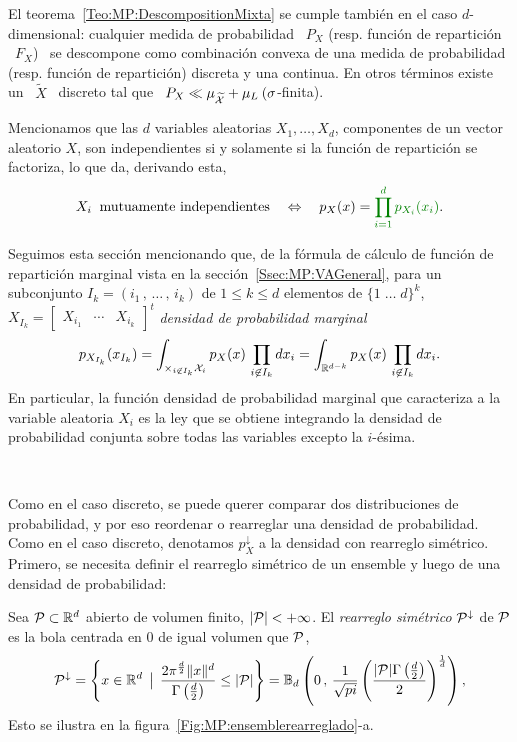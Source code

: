 El                                      teorema~\ref{Teo:MP:DescompositionMixta}
se cumple tambi\'en en el caso $d$-dimensional: cualquier medida de probabilidad
\  $P_X$  (resp.  funci\'on  de  repartici\'on \  $F_X$)  \  se descompone  como
combinaci\'on  convexa  de  una  medida  de probabilidad  (resp.   funci\'on  de
repartici\'on)  discreta  y una  continua.   En  otros  t\'erminos existe  un  \
$\widetilde{X}$ \  discreto tal que \  $P_X \ll \mu_{\widetilde{\X}}  + \mu_L \:
(\sigma$-finita).

Mencionamos que las $d$ variables  aleatorias $X_1, \ldots, X_d$, componentes de
un vector  aleatorio $X$, son independientes  si y solamente si  la funci\'on de
repartici\'on se factoriza, lo que da, derivando esta,
%
\[
X_i \:  \mbox{ mutuamente independientes} \quad \Leftrightarrow  \quad p_X(x) =
\modif{\prod_{i=1}^d p_{X_i}(x_i)}.
\]


Seguimos esta secci\'on mencionando que, de la f\'ormula de c\'alculo de funci\'on
de  repartici\'on marginal vista en la secci\'on~\ref{Ssec:MP:VAGeneral},
para un subconjunto $I_k = (i_1 \, , \,  \ldots \, , \, i_k)$ de $1 \le k \le d$
elementos de  $\{ 1 \; \ldots \;  d \}^k$, $X_{I_k} =  \begin{bmatrix} X_{i_1} &
  \cdots & X_{i_k}\end{bmatrix}^t$ \modif{tiene la} {\it densidad de probabilidad marginal}
%
\[
p_{X_{I_k}}(x_{I_k})  = \int_{\times_{i  \not\in  I_k} \X_i}  p_X(x) \,  \prod_{i
    \not\in I_k}  dx_i =  \int_{\Rset^{d-k}} p_X(x) \,  \prod_{i \not\in
      I_k} dx_i.
\]
%
En particular, la funci\'on densidad  de probabilidad marginal que caracteriza a
la variable aleatoria  $X_i$ es la ley que se obtiene  integrando la densidad de
probabilidad conjunta sobre todas las variables excepto la $i$-\'esima.

\

Como  en  el caso  discreto,  se puede  querer  comparar  dos distribuciones  de
probabilidad, y  por eso  reordenar o rearreglar  una densidad  de probabilidad.
Como en el caso discreto, denotamos $p_X^\downarrow$ a la densidad con rearreglo
sim\'etrico.   Primero,  se necesita  definir  el  rearreglo  sim\'etrico de  un
ensemble y luego de una densidad de probabilidad:
%
\begin{definicion}
\label{Def:MP:RearregloConjunto}
%
  Sea $\P \subset \Rset^d$ abierto de  volumen finito, $|\P| < +\infty$.  El {\it
    rearreglo sim\'etrico} $\P^\downarrow$  de $\P$ es la bola  centrada en 0 de
 igual volumen que $\P$, \ie
  \[
  \P^\downarrow  =   \left\{  x   \in  \Rset^d  \tq   \frac{2  \pi^{\frac{d}{2}}
      \|x\|^d}{\Gamma\left(\frac{d}{2}\right)} \le |\P| \right\} = \Bset_d\left(
    0  \,  , \,  \frac1{\sqrt{pi}}  \left(  \frac{|\P| \Gamma\left(  \frac{d}{2}
        \right)}{2} \right)^{\frac1d} \right),
  \]
  Esto se ilustra en la figura~\ref{Fig:MP:ensemblerearreglado}-a.
\end{definicion}


